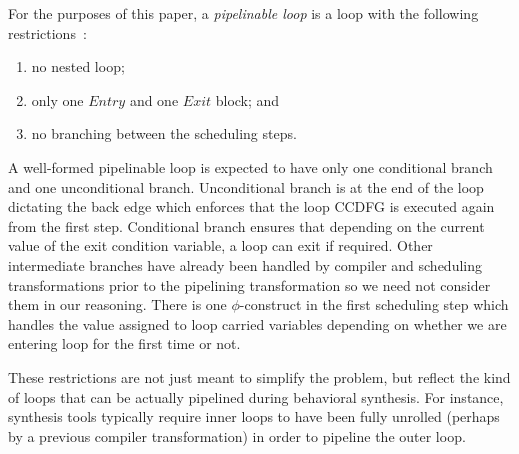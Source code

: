 For the purposes of this paper, a {\em pipelinable loop} is
a loop with the following restrictions~\cite{hrx:dac-12}:
\begin{enumerate}
\item no nested loop;
\item only one $Entry$ and one $Exit$ block; and
\item no branching between the scheduling steps.
\end{enumerate}

A well-formed pipelinable loop is expected to have only one conditional branch and one unconditional branch. 
Unconditional branch is at the end of the loop dictating the back edge which enforces that the loop CCDFG is executed again from the first step. 
Conditional branch ensures that depending on the current value of the exit condition variable, a loop can exit if required. 
Other intermediate branches have already been handled by compiler and scheduling transformations prior to the pipelining transformation
so we need not consider them in our reasoning. There is one $\phi$-construct in the first scheduling step which handles the value assigned
to loop carried variables depending on whether we are entering loop for the first time or not. 

These restrictions are not just meant to simplify the problem, but reflect
the kind of loops that can be actually pipelined during behavioral
synthesis.  For instance, synthesis tools typically require inner
loops to have been fully unrolled (perhaps by a previous compiler
transformation) in order to pipeline the outer loop.


